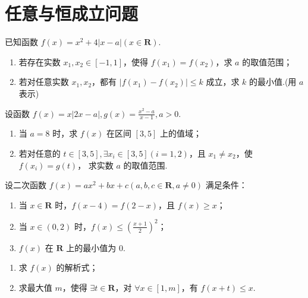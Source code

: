 \documentclass[a4paper , final]{ctexart}
\newenvironment{problem}[1]{%
  \item #1
  \par
  \vspace{8cm}
}{}
\begin{document}
\newpage
\section*{任意与恒成立问题}

\begin{problems}
    \begin{problem}
        {
            已知函数 $ f(x) = x^2+4\left\vert x-a\right\vert (x\in \mathbf{R})$.
            \begin{enumerate}[label=(\arabic*)]
                \item 若存在实数 $ x_1,x_2 \in [-1,1]$，使得 $ f(x_1) = f(x_2)$，求 $ a$ 的取值范围；
                \item 若对任意实数 $x_1,x_2$，都有 $\left\vert f(x_1)-f(x_2)\right\vert\leq k$ 成立，求 $ k$ 的最小值.(用 $a$ 表示)
            \end{enumerate}
        }
    \end{problem}

    \begin{problem}
        {
            设函数 $f(x)=x\left\vert 2x-a\right\vert,g(x) = \frac{x^2-a}{x-1},a>0$.
            \begin{enumerate}[label=(\arabic*)]
                \item 当 $a=8$ 时，求 $f(x)$ 在区间 $[3,5]$ 上的值域；
                \item 若对任意的 $t\in[3,5],\exists x_i\in[3,5](i=1,2)$，且 $x_1\neq x_2$，使 $f(x_i) = g(t)$， 求实数 $a$ 的取值范围.
            \end{enumerate}
        }
    \end{problem}

    \newpage
    \begin{problem}
        {
            设二次函数 $f(x) = ax^2+bx+c(a,b,c\in \mathbf{R},a\neq 0)$ 满足条件：
            \begin{enumerate}[label=\alph*.]
                \item 当 $x\in \mathbf{R}$ 时，$f(x-4)=f(2-x)$，且 $f(x)\geq x$；
                \item 当 $x\in (0,2)$ 时，$f(x)\leq \left(\frac{x+1}{2}\right)^2$；
                \item $f(x)$ 在 $\mathbf{R}$ 上的最小值为 $0$.
            \end{enumerate}
            \begin{enumerate}[label=(\arabic*)]
                \item 求 $f(x)$ 的解析式；
                \item 求最大值 $m$，使得 $\exists t\in\mathbf{R}$，对 $\forall x \in [1,m]$，有 $f(x+t)\leq x$.
            \end{enumerate}
        }
    \end{problem}
    
\end{problems}
\end{document}
